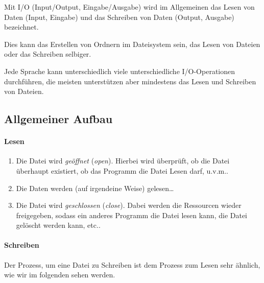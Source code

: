 
Mit I/O (Input/Output, Eingabe/Ausgabe) wird im Allgemeinen das Lesen von Daten (Input, Eingabe) und das Schreiben von Daten (Output, Ausgabe) bezeichnet.

Dies kann das Erstellen von Ordnern im Dateisystem sein, das Lesen von Dateien oder das Schreiben selbiger.

Jede Sprache kann unterschiedlich viele unterschiedliche I/O-Operationen durchführen, die meisten unterstützen aber mindestens das Lesen und Schreiben von Dateien.

\subsection{Allgemeiner Aufbau}
	
	\paragraph{Lesen}
		\begin{enumerate}
			\item Die Datei wird \textit{geöffnet} (\textit{open}). Hierbei wird überprüft, ob die Datei überhaupt existiert, ob das Programm die Datei Lesen darf, u.v.m..
			\item Die Daten werden (auf irgendeine Weise) gelesen\dots
			\item Die Datei wird \textit{geschlossen} (\textit{close}). Dabei werden die Ressourcen wieder freigegeben, sodass ein anderes Programm die Datei lesen kann, die Datei gelöscht werden kann, etc..
		\end{enumerate}
		
	
	\paragraph{Schreiben}
		Der Prozess, um eine Datei zu Schreiben ist dem Prozess zum Lesen sehr ähnlich, wie wir im folgenden sehen werden.
	
